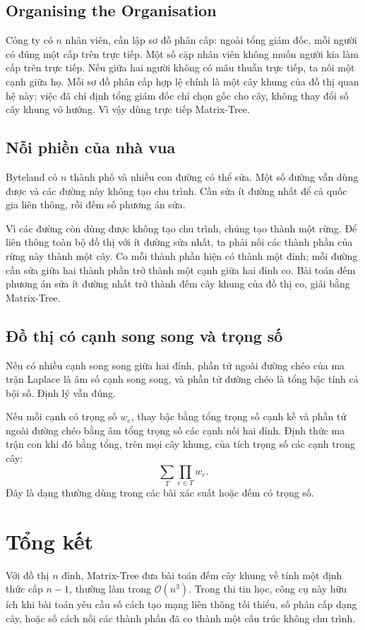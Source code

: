 \documentclass[11pt]{article}
\newcommand{\Oh}{\mathcal{O}}
\begin{document}
\subsection{Organising the Organisation}

Công ty có \(n\) nhân viên, cần lập sơ đồ phân cấp: ngoài tổng giám đốc, mỗi
người có đúng một cấp trên trực tiếp. Một số cặp nhân viên không muốn người
kia làm cấp trên trực tiếp. Nếu giữa hai người không có mâu thuẫn trực tiếp,
ta nối một cạnh giữa họ. Mỗi sơ đồ phân cấp hợp lệ chính là một cây khung của
đồ thị quan hệ này; việc đã chỉ định tổng giám đốc chỉ chọn gốc cho cây, không
thay đổi số cây khung vô hướng. Vì vậy dùng trực tiếp Matrix-Tree.

\subsection{Nỗi phiền của nhà vua}

Byteland có \(n\) thành phố và nhiều con đường có thể sửa. Một số đường vẫn
dùng được và các đường này không tạo chu trình. Cần sửa ít đường nhất để cả
quốc gia liên thông, rồi đếm số phương án sửa.

Vì các đường còn dùng được không tạo chu trình, chúng tạo thành một rừng. Để
liên thông toàn bộ đồ thị với ít đường sửa nhất, ta phải nối các thành phần
của rừng này thành một cây. Co mỗi thành phần hiện có thành một đỉnh; mỗi
đường cần sửa giữa hai thành phần trở thành một cạnh giữa hai đỉnh co. Bài
toán đếm phương án sửa ít đường nhất trở thành đếm cây khung của đồ thị co,
giải bằng Matrix-Tree.

\subsection{Đồ thị có cạnh song song và trọng số}

Nếu có nhiều cạnh song song giữa hai đỉnh, phần tử ngoài đường chéo của ma
trận Laplace là âm số cạnh song song, và phần tử đường chéo là tổng bậc tính
cả bội số. Định lý vẫn đúng.

Nếu mỗi cạnh có trọng số \(w_e\), thay bậc bằng tổng trọng số cạnh kề và phần
tử ngoài đường chéo bằng âm tổng trọng số các cạnh nối hai đỉnh. Định thức
ma trận con khi đó bằng tổng, trên mọi cây khung, của tích trọng số các cạnh
trong cây:
\[
  \sum_{T}\prod_{e\in T}w_e.
\]
Đây là dạng thường dùng trong các bài xác suất hoặc đếm có trọng số.

\section{Tổng kết}

Với đồ thị \(n\) đỉnh, Matrix-Tree đưa bài toán đếm cây khung về tính một
định thức cấp \(n-1\), thường làm trong \(\Oh(n^3)\). Trong thi tin học, công
cụ này hữu ích khi bài toán yêu cầu số cách tạo mạng liên thông tối thiểu,
số phân cấp dạng cây, hoặc số cách nối các thành phần đã co thành một cấu
trúc không chu trình.
\end{document}
